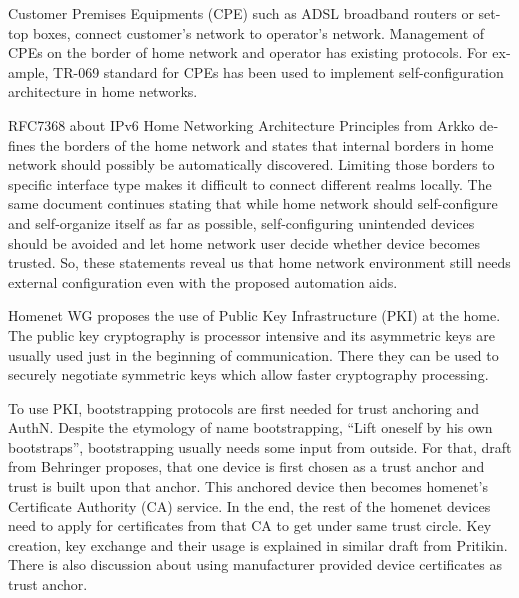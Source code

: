 \documentclass[12pt,a4paper,english]{tutthesis}
\begin{document}
\begin{otherlanguage}{english}
Customer Premises Equipments (CPE) such as ADSL broadband routers or
set-top boxes, connect customer's network to operator's network.
Management of CPEs on the border of home network and operator has 
existing protocols. For example, TR-069 standard\cite{iptvtr069} for CPEs
has been used to implement self-configuration archi\-tecture in
home networks\cite{tr069rachidi2011}.


RFC7368 about IPv6 Home Networking Architecture Principles from
Arkko\cite{rfc7368} defines the borders of the home network and states that
internal borders in home network should possibly be automatically
discovered. Limiting those borders to specific
interface type makes it difficult to connect different realms locally.
The same document continues stating
that while home network should self-configure and self-organize itself as
far as possible, self-configuring unintended devices should be
avoided and let home network user decide whether device becomes trusted.
So, these statements reveal us that home network environment still needs
external configuration even with the proposed automation aids.





Homenet WG proposes the use of Public Key Infrastructure (PKI) at the
home. The public key cryptography is processor intensive and its
asymmetric keys are usually used just in the beginning of
communication. There they can be used to securely negotiate symmetric
keys which allow faster cryptography processing.

To use PKI, bootstrapping protocols are first needed for trust
anchoring and AuthN.  Despite the etymology of name bootstrapping,
``Lift oneself by his own bootstraps'', bootstrapping usually needs
some input from outside.
For that, draft from Behringer\cite{draft-behringer-bootstrap} proposes,
that one device is first chosen as a trust anchor and trust is
built upon that anchor. This anchored device then becomes homenet's
Certificate Authority (CA) service. In the end, the rest of the homenet 
devices need to apply for certificates from that CA to get under same
trust circle.
Key creation, key exchange and their usage is explained in similar
draft from Pritikin\cite{draft-pritikin-bootstrap}. There is also discussion about using
manufacturer provided device certificates as trust anchor.  




\end{otherlanguage}
\end{document}
